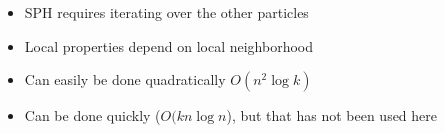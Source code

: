 \documentclass[../main.tex]{subfiles}
\begin{document}
\begin{itemize}
    \item SPH requires iterating over the other particles
    \item Local properties depend on local neighborhood
    \item Can easily be done quadratically $O(n^2 \log k)$
    \item Can be done quickly ($O(k n \log n$), but that has not been used here
\end{itemize}
\end{document}
